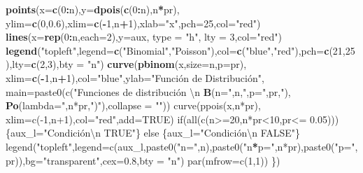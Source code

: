 \documentclass[]{book}
\newenvironment{Shaded}{\begin{snugshade}}{\end{snugshade}}
\newcommand{\DataTypeTok}[1]{\textcolor[rgb]{0.13,0.29,0.53}{#1}}
\newcommand{\DecValTok}[1]{\textcolor[rgb]{0.00,0.00,0.81}{#1}}
\newcommand{\FloatTok}[1]{\textcolor[rgb]{0.00,0.00,0.81}{#1}}
\newcommand{\KeywordTok}[1]{\textcolor[rgb]{0.13,0.29,0.53}{\textbf{#1}}}
\newcommand{\NormalTok}[1]{#1}
\newcommand{\OperatorTok}[1]{\textcolor[rgb]{0.81,0.36,0.00}{\textbf{#1}}}
\newcommand{\StringTok}[1]{\textcolor[rgb]{0.31,0.60,0.02}{#1}}
\begin{document}
\begin{Shaded}
\begin{Highlighting}[]
  \KeywordTok{points}\NormalTok{(}\DataTypeTok{x=}\KeywordTok{c}\NormalTok{(}\DecValTok{0}\OperatorTok{:}\NormalTok{n),}\DataTypeTok{y=}\KeywordTok{dpois}\NormalTok{(}\KeywordTok{c}\NormalTok{(}\DecValTok{0}\OperatorTok{:}\NormalTok{n),n}\OperatorTok{*}\NormalTok{pr),}
       \DataTypeTok{ylim=}\KeywordTok{c}\NormalTok{(}\DecValTok{0}\NormalTok{,}\FloatTok{0.6}\NormalTok{),}\DataTypeTok{xlim=}\KeywordTok{c}\NormalTok{(}\OperatorTok{-}\DecValTok{1}\NormalTok{,n}\OperatorTok{+}\DecValTok{1}\NormalTok{),}\DataTypeTok{xlab=}\StringTok{"x"}\NormalTok{,}\DataTypeTok{pch=}\DecValTok{25}\NormalTok{,}\DataTypeTok{col=}\StringTok{"red"}\NormalTok{)}
  \KeywordTok{lines}\NormalTok{(}\DataTypeTok{x=}\KeywordTok{rep}\NormalTok{(}\DecValTok{0}\OperatorTok{:}\NormalTok{n,}\DataTypeTok{each=}\DecValTok{2}\NormalTok{),}\DataTypeTok{y=}\NormalTok{aux, }\DataTypeTok{type =} \StringTok{"h"}\NormalTok{, }\DataTypeTok{lty =} \DecValTok{3}\NormalTok{,}\DataTypeTok{col=}\StringTok{"red"}\NormalTok{)}
  \KeywordTok{legend}\NormalTok{(}\StringTok{"topleft"}\NormalTok{,}\DataTypeTok{legend=}\KeywordTok{c}\NormalTok{(}\StringTok{"Binomial"}\NormalTok{,}\StringTok{"Poisson"}\NormalTok{),}\DataTypeTok{col=}\KeywordTok{c}\NormalTok{(}\StringTok{"blue"}\NormalTok{,}\StringTok{"red"}\NormalTok{),}\DataTypeTok{pch=}\KeywordTok{c}\NormalTok{(}\DecValTok{21}\NormalTok{,}\DecValTok{25}\NormalTok{),}\DataTypeTok{lty=}\KeywordTok{c}\NormalTok{(}\DecValTok{2}\NormalTok{,}\DecValTok{3}\NormalTok{),}\DataTypeTok{bty =} \StringTok{"n"}\NormalTok{)}
  \KeywordTok{curve}\NormalTok{(}\KeywordTok{pbinom}\NormalTok{(x,}\DataTypeTok{size=}\NormalTok{n,}\DataTypeTok{p=}\NormalTok{pr),}
        \DataTypeTok{xlim=}\KeywordTok{c}\NormalTok{(}\OperatorTok{-}\DecValTok{1}\NormalTok{,n}\OperatorTok{+}\DecValTok{1}\NormalTok{),}\DataTypeTok{col=}\StringTok{"blue"}\NormalTok{,}\DataTypeTok{ylab=}\StringTok{"Función de Distribución",}
\StringTok{         main=paste0(c("}\NormalTok{Funciones de distribución \textbackslash{}n }\KeywordTok{B}\NormalTok{(}\DataTypeTok{n=}\StringTok{",n,"}\NormalTok{,}\DataTypeTok{p=}\StringTok{",pr,"}\NormalTok{), }\KeywordTok{Po}\NormalTok{(}\DataTypeTok{lambda=}\StringTok{",n*pr,"}\NormalTok{)}\StringTok{"),collapse = ""))}
\StringTok{  curve(ppois(x,n*pr),}
\StringTok{        xlim=c(-1,n+1),col="}\NormalTok{red}\StringTok{",add=TRUE)}
\StringTok{  if(all(c(n>=20,n*pr<10,pr<= 0.05)))\{aux_l="}\NormalTok{Condición\textbackslash{}n TRUE}\StringTok{"\} else \{aux_l="}\NormalTok{Condición\textbackslash{}n FALSE}\StringTok{"\}}
\StringTok{  legend("}\NormalTok{topleft}\StringTok{",legend=c(aux_l,paste0("}\DataTypeTok{n=}\StringTok{",n),paste0("}\NormalTok{n}\OperatorTok{*}\DataTypeTok{p=}\StringTok{",n*pr),paste0("}\DataTypeTok{p=}\StringTok{",pr)),bg="}\NormalTok{transparent}\StringTok{",cex=0.8,bty = "}\NormalTok{n}\StringTok{")}
\StringTok{  par(mfrow=c(1,1))}
\StringTok{\})}
\end{Highlighting}
\end{Shaded}
\end{document}
